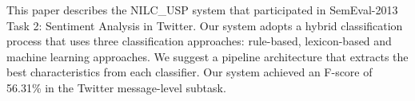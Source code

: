 This paper describes the NILC\_USP system that participated in SemEval-2013 Task
 2: Sentiment Analysis in Twitter. Our system adopts a hybrid classification
 process that uses three classification approaches: rule-based, lexicon-based
 and machine learning approaches. We suggest a pipeline architecture that
 extracts the best characteristics from each classifier. Our system achieved an
 F-score of 56.31\% in the Twitter message-level subtask.

